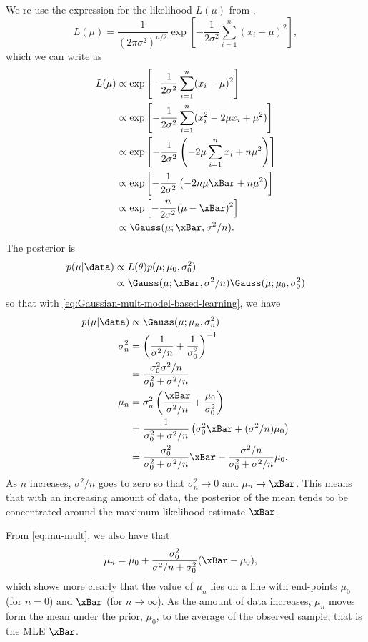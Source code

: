 \begin{solution}
We re-use the expression for the likelihood $L(\mu)$ from .
\begin{equation}
  L(\mu) = \frac{1}{(2\pi\sigma^2)^{n/2}}\exp\left[-\frac{1}{2\sigma^2}\sum_{i=1}^n (x_i-\mu)^2\right],
\end{equation}
which we can write as
\begin{align}
  L(\mu) & \propto \exp\left[-\frac{1}{2\sigma^2}\sum_{i=1}^n (x_i-\mu)^2\right]\\
  & \propto  \exp\left[-\frac{1}{2\sigma^2}\sum_{i=1}^n (x_i^2-2\mu x_i + \mu^2)\right]\\
  & \propto  \exp\left[-\frac{1}{2\sigma^2}\left( -2 \mu \sum_{i=1}^n x_i + n \mu^2 \right)\right]\\
  & \propto  \exp\left[-\frac{1}{2\sigma^2}\left( -2n \mu \xBar + n \mu^2 \right)\right]\\
  & \propto  \exp\left[-\frac{n}{2\sigma^2}(\mu-\xBar)^2 \right]\\
  & \propto  \Gauss(\mu ; \xBar, \sigma^2/n).
\end{align}
The posterior is
\begin{align}
  p(\mu | \data) & \propto L(\theta) p(\mu; \mu_0, \sigma_0^2)\\
  & \propto  \Gauss(\mu ; \xBar, \sigma^2/n)  \Gauss(\mu ; \mu_0, \sigma_0^2)
\end{align}
so that with \eqref{eq:Gaussian-mult-model-based-learning}, we have
\begin{align}
  p(\mu | \data) & \propto \Gauss(\mu ; \mu_n, \sigma_n^2)\\
  \sigma^2_n & =  \left( \frac{1}{\sigma^2/n} + \frac{1}{\sigma_0^2}\right)^{-1} \\
  & =  \frac{ \sigma_0^2 \sigma^2/n}{\sigma_0^2+\sigma^2/n}\\
  \mu_n & =  \sigma_n^2\left( \frac{\xBar}{\sigma^2/n}+ \frac{\mu_0}{\sigma_0^2}\right)\\
  & = \frac{1}{\sigma_0^2+\sigma^2/n}\left(\sigma_0^2 \xBar + (\sigma^2/n) \mu_0\right)\\
  & = \frac{\sigma_0^2}{\sigma_0^2+\sigma^2/n} \xBar + \frac{\sigma^2/n} {\sigma_0^2+\sigma^2/n} \mu_0.
\end{align}
As $n$ increases, $\sigma^2/n$ goes to zero so that $\sigma_n^2 \to 0$
and $\mu_n \to \xBar$. This means that with an increasing amount of
data, the posterior of the mean tends to be concentrated around the
maximum likelihood estimate $\xBar$.

From \eqref{eq:mu-mult}, we also have that
\begin{align}
\mu_n & = \mu_0 + \frac{\sigma_0^2}{\sigma^2/n+\sigma_0^2}(\xBar-\mu_0),
\end{align}
which shows more clearly that the value of $\mu_n$ lies on a line with end-points $\mu_0$ (for $n =0$) and $\xBar$ (for $n \to \infty$). As
the amount of data increases, $\mu_n$ moves form the mean under the prior, $\mu_0$, to the average of the observed sample, that is the MLE $\xBar$.
\end{solution}


